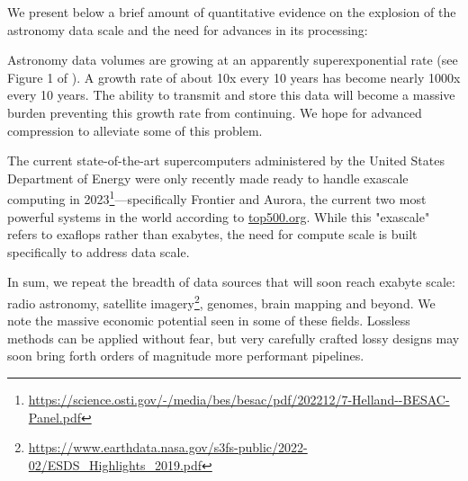 We present below a brief amount of quantitative evidence on the explosion of the astronomy data scale and the need for advances in its processing:

Astronomy data volumes are growing at an apparently superexponential rate (see Figure 1 of \citep{maireles2023efficient}). A growth rate of about 10x every 10 years has become nearly 1000x every 10 years. The ability to transmit and store this data will become a massive burden preventing this growth rate from continuing. We hope for advanced compression to alleviate some of this problem.

The current state-of-the-art supercomputers administered by the United States Department of Energy were only recently made ready to handle exascale computing in 2023\footnote{\url{https://science.osti.gov/-/media/bes/besac/pdf/202212/7-Helland--BESAC-Panel.pdf}}—specifically Frontier and Aurora, the current two most powerful systems in the world according to \url{top500.org}. While this "exascale" refers to exaflops rather than exabytes, the need for compute scale is built specifically to address data scale.

In sum, we repeat the breadth of data sources that will soon reach exabyte scale: radio astronomy, satellite imagery\footnote{\url{https://www.earthdata.nasa.gov/s3fs-public/2022-02/ESDS\_Highlights\_2019.pdf}}, genomes, brain mapping and beyond. We note the massive economic potential seen in some of these fields. Lossless methods can be applied without fear, but very carefully crafted lossy designs may soon bring forth orders of magnitude more performant pipelines.

